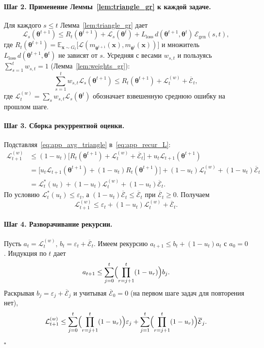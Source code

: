 \documentclass[a4paper,14pt,oneside,openany]{extarticle}
\newcommand{\bx}{\mathbf{x}}
\newcommand{\cL}{\mathcal{L}}
\newcommand{\cE}{\mathcal{E}}
\newcommand{\bbE}{\mathbb{E}}
\newcommand{\btheta}{\boldsymbol{\theta}}
\begin{document}
\paragraph{Шаг 2. Применение Леммы~\ref{lem:triangle_gr} к каждой задаче.} Для каждого $s \le t$ Лемма~\ref{lem:triangle_gr} дает
\[
    \cL_s(\btheta^{t+1}) \le R_t(\btheta^{t+1}) + \cL_s(\btheta^t) + {L_{\text{loss}}\, d(\btheta^{t+1}, \btheta^t)\,} \cE_{\mathrm{gen}}(s, t),
\]
где $R_t(\btheta^{t+1}) = \bbE_{\bx \sim G_t}\bigl[\cL(m_{\btheta^{t+1}}(\bx), m_{\btheta^t}(\bx))\bigr]$ и множитель $L_{\text{loss}}\, d(\btheta^{t+1}, \btheta^t)$ не зависят от $s$. Усредняя с весами $w_{s, t}$ и пользуясь $\sum_{s=1}^t w_{s, t} = 1$ (Лемма~\ref{lem:weights_gr}):
\begin{equation}
    \sum_{s=1}^{t} w_{s, t} \cL_s(\btheta^{t+1}) \le R_t(\btheta^{t+1}) + \cL^{(w)}_t + \overline{\mathcal E}_t,
    \label{eq:app_avg_triangle}
\end{equation}
где $\cL^{(w)}_t = \sum_s w_{s, t} \cL_s(\btheta^t)$ обозначает взвешенную среднюю ошибку на прошлом шаге.

\paragraph{Шаг 3. Сборка рекуррентной оценки.} Подставляя~\eqref{eq:app_avg_triangle} в~\eqref{eq:app_recur_L}:
\begin{align*}
    \cL^{(w)}_{t+1} &\le (1 - u_t)\bigl[R_t(\btheta^{t+1}) + \cL^{(w)}_t + \overline{\mathcal E}_t\bigr] + u_t \cL_{t+1}(\btheta^{t+1}) \\
    &= \bigl[u_t \cL_{t+1}(\btheta^{t+1}) + (1 - u_t) R_t(\btheta^{t+1})\bigr] + (1 - u_t)\cL^{(w)}_t + (1 - u_t)\overline{\mathcal E}_t \\
    &= \cL^*_t(u_t) + (1 - u_t)\cL^{(w)}_t + (1 - u_t)\overline{\mathcal E}_t.
\end{align*}
По условию $\cL^*_t(u_t) \le \varepsilon_t$, а $(1 - u_t)\overline{\mathcal E}_t \le \overline{\mathcal E}_t$ при $\overline{\mathcal E}_t \ge 0$. Получаем
\[
    \cL^{(w)}_{t+1} \le \varepsilon_t + (1 - u_t)\cL^{(w)}_t + \overline{\mathcal E}_t.
\]

\paragraph{Шаг 4. Разворачивание рекурсии.} Пусть $a_t = \cL^{(w)}_t$, $b_t = \varepsilon_t + \overline{\mathcal E}_t$. Имеем рекурсию $a_{t+1} \le b_t + (1 - u_t) a_t$ с $a_0 = 0$. Индукция по $t$ дает
\[
    a_{t+1} \le \sum_{j=0}^{t}\Bigl(\prod_{r=j+1}^{t}(1 - u_r)\Bigr) b_j.
\]
Раскрывая $b_j = \varepsilon_j + \overline{\mathcal E}_j$ и учитывая $\overline{\mathcal E}_0 = 0$ (на первом шаге задач для повторения нет),
\[
    \cL^{(w)}_{t+1} \le \sum_{j=0}^{t}\Bigl(\prod_{r=j+1}^{t}(1 - u_r)\Bigr)\varepsilon_j + \sum_{j=1}^{t}\Bigl(\prod_{r=j+1}^{t}(1 - u_r)\Bigr) \overline{\mathcal E}_j.
\]
\hfill$\square$
\end{document}
